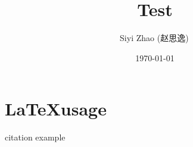 \documentclass[10pt, a4paper]{ctexart}
\title{Test}
\author{Siyi Zhao (赵思逸)\,\orcidlink{0009-0001-4492-5158}}
\date{\today}
\theoremstyle{SettingTheorem}
\begin{document}
\maketitle
\tableofcontents




\section*{\LaTeX usage}
citation example\cite{lyth2009}



\end{document}
